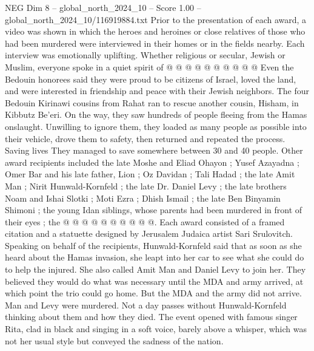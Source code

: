 \begin{textsample}{NEG Dim 8 – global\_north\_2024\_10 – Score 1.00 – global\_north\_2024\_10/116919884.txt}
Prior to the presentation of each award, a video was shown in which the heroes and heroines or close relatives of those who had been murdered were interviewed in their homes or in the fields nearby.
Each interview was emotionally uplifting.
Whether religious or secular, Jewish or Muslim, everyone spoke in a quiet spirit of @ @ @ @ @ @ @ @ @ @ Even the Bedouin honorees said they were proud to be citizens of Israel, loved the land, and were interested in friendship and peace with their Jewish neighbors.
The four Bedouin Kirinawi cousins from Rahat ran to rescue another cousin, Hisham, in Kibbutz Be'eri.
On the way, they saw hundreds of people fleeing from the Hamas onslaught.
Unwilling to ignore them, they loaded as many people as possible into their vehicle, drove them to safety, then returned and repeated the process.
Saving lives They managed to save somewhere between 30 and 40 people.
Other award recipients included the late Moshe and Eliad Ohayon ; Yusef Azayadna ; Omer Bar and his late father, Lion ; Oz Davidan ; Tali Hadad ; the late Amit Man ; Nirit Hunwald-Kornfeld ; the late Dr.
Daniel Levy ; the late brothers Noam and Ishai Slotki ; Moti Ezra ; Dhish Ismail ; the late Ben Binyamin Shimoni ; the young Idan siblings, whose parents had been murdered in front of their eyes ; the @ @ @ @ @ @ @ @ @ @.
Each award consisted of a framed citation and a statuette designed by Jerusalem Judaica artist Sari Srulovitch.
Speaking on behalf of the recipients, Hunwald-Kornfeld said that as soon as she heard about the Hamas invasion, she leapt into her car to see what she could do to help the injured.
She also called Amit Man and Daniel Levy to join her.
They believed they would do what was necessary until the MDA and army arrived, at which point the trio could go home.
But the MDA and the army did not arrive.
Man and Levy were murdered.
Not a day passes without Hunwald-Kornfeld thinking about them and how they died.
The event opened with famous singer Rita, clad in black and singing in a soft voice, barely above a whisper, which was not her usual style but conveyed the sadness of the nation.

\end{textsample}
